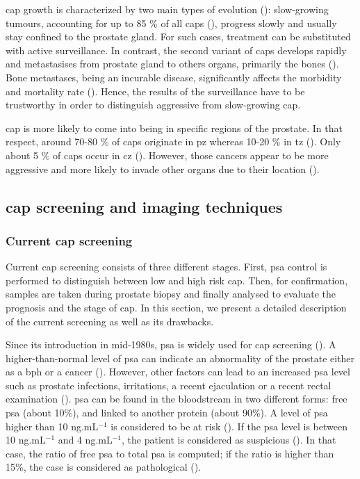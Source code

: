 \ac{cap} growth is characterized by two main types of evolution (\cite{Strum2005}): slow-growing tumours, accounting for up to 85 \% of all \acp{cap} (\cite{Lu-Yao2009}), progress slowly and usually stay confined to the prostate gland. For such cases, treatment can be substituted with active surveillance. In contrast, the second variant of \acp{cap} develops rapidly and metastasises from prostate gland to others organs, primarily the bones (\cite{Oster2013}). Bone metastases, being an incurable disease, significantly affects the morbidity and mortality rate (\cite{Ye2007}). Hence, the  results of the surveillance have to be trustworthy in order to distinguish aggressive from slow-growing \ac{cap}.

\ac{cap} is more likely to come into being in specific regions of the prostate. In that respect, around 70-80 \% of \acp{cap} originate in \ac{pz} whereas 10-20 \% in \ac{tz} (\cite{Carrol1987,McNeal1988,Stamey1998}). Only about 5 \% of \acp{cap} occur in \ac{cz} (\cite{McNeal1988,Cohen2008}). However, those cancers appear to be more aggressive and more likely to invade other organs due to their location (\cite{Cohen2008}).

\subsection{\ac{cap} screening and imaging techniques}

\subsubsection{Current \ac{cap} screening}\label{subsubsec:curscr}

Current \ac{cap} screening consists of three different stages. First, \ac{psa} control is performed to distinguish between low and high risk \ac{cap}. Then, for confirmation, samples are taken during prostate biopsy and finally analysed to evaluate the prognosis and the stage of \ac{cap}. In this section, we present a detailed description of the current screening as well as its drawbacks.

Since its introduction in mid-1980s, \ac{psa} is widely used for \ac{cap} screening (\cite{Etzioni2002}). A higher-than-normal level of \ac{psa} can indicate an abnormality of the prostate either as a \ac{bph} or a cancer (\cite{Hoeks2011}). However, other factors can lead to an increased \ac{psa} level such as prostate infections, irritations, a recent ejaculation or a recent rectal examination (\cite{Parfait2010}). \ac{psa} can be found in the bloodstream in two different forms: free \ac{psa} (about 10\%), and linked to another protein (about 90\%). A level of \ac{psa} higher than 10 ng.mL$^{-1}$ is considered to be at risk (\cite{Parfait2010}). If the \ac{psa} level is between 10 ng.mL$^{-1}$ and 4 ng.mL$^{-1}$, the patient is considered as suspicious (\cite{Barentsz2012}). In that case, the ratio of free \ac{psa} to total \ac{psa} is computed; if the ratio is higher than 15\%, the case is considered as pathological (\cite{Parfait2010}).

